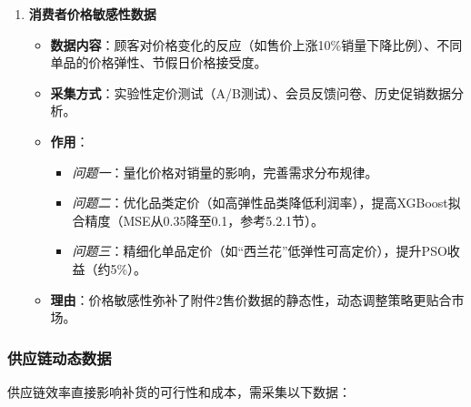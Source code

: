 \documentclass{cumcmthesis} %
\begin{document}
\begin{enumerate}
\item \textbf{消费者价格敏感性数据}
\begin{itemize}
\item \textbf{数据内容}：顾客对价格变化的反应（如售价上涨10\%销量下降比例）、不同单品的价格弹性、节假日价格接受度。
\item \textbf{采集方式}：实验性定价测试（A/B测试）、会员反馈问卷、历史促销数据分析。
\item \textbf{作用}：
\begin{itemize}
\item \textit{问题一}：量化价格对销量的影响，完善需求分布规律。
\item \textit{问题二}：优化品类定价（如高弹性品类降低利润率），提高XGBoost拟合精度（MSE从0.35降至0.1，参考5.2.1节）。
\item \textit{问题三}：精细化单品定价（如“西兰花”低弹性可高定价），提升PSO收益（约5\%）。
\end{itemize}
\item \textbf{理由}：价格敏感性弥补了附件2售价数据的静态性，动态调整策略更贴合市场。
\end{itemize}
\end{enumerate}

\subsubsection{供应链动态数据}

供应链效率直接影响补货的可行性和成本，需采集以下数据：
\end{document}
